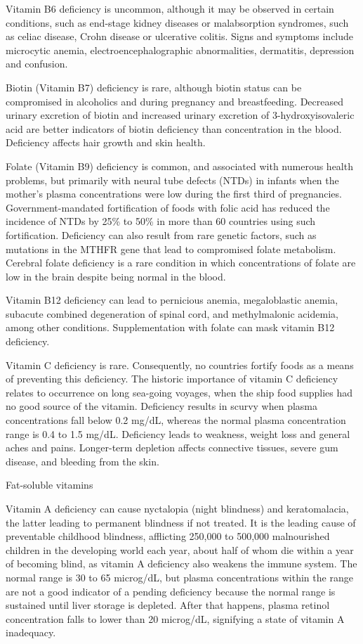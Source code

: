 \documentclass[
  openany]{book}
\begin{document}
Vitamin B6 deficiency is uncommon, although it may be observed in certain conditions, such as end-stage kidney diseases or malabsorption syndromes, such as celiac disease, Crohn disease or ulcerative colitis. Signs and symptoms include microcytic anemia, electroencephalographic abnormalities, dermatitis, depression and confusion.

Biotin (Vitamin B7) deficiency is rare, although biotin status can be compromised in alcoholics and during pregnancy and breastfeeding. Decreased urinary excretion of biotin and increased urinary excretion of 3-hydroxyisovaleric acid are better indicators of biotin deficiency than concentration in the blood. Deficiency affects hair growth and skin health.

Folate (Vitamin B9) deficiency is common, and associated with numerous health problems, but primarily with neural tube defects (NTDs) in infants when the mother's plasma concentrations were low during the first third of pregnancies. Government-mandated fortification of foods with folic acid has reduced the incidence of NTDs by 25\% to 50\% in more than 60 countries using such fortification. Deficiency can also result from rare genetic factors, such as mutations in the MTHFR gene that lead to compromised folate metabolism. Cerebral folate deficiency is a rare condition in which concentrations of folate are low in the brain despite being normal in the blood.

Vitamin B12 deficiency can lead to pernicious anemia, megaloblastic anemia, subacute combined degeneration of spinal cord, and methylmalonic acidemia, among other conditions. Supplementation with folate can mask vitamin B12 deficiency.

Vitamin C deficiency is rare. Consequently, no countries fortify foods as a means of preventing this deficiency. The historic importance of vitamin C deficiency relates to occurrence on long sea-going voyages, when the ship food supplies had no good source of the vitamin. Deficiency results in scurvy when plasma concentrations fall below 0.2 mg/dL, whereas the normal plasma concentration range is 0.4 to 1.5 mg/dL. Deficiency leads to weakness, weight loss and general aches and pains. Longer-term depletion affects connective tissues, severe gum disease, and bleeding from the skin.

Fat-soluble vitamins

Vitamin A deficiency can cause nyctalopia (night blindness) and keratomalacia, the latter leading to permanent blindness if not treated. It is the leading cause of preventable childhood blindness, afflicting 250,000 to 500,000 malnourished children in the developing world each year, about half of whom die within a year of becoming blind, as vitamin A deficiency also weakens the immune system. The normal range is 30 to 65 microg/dL, but plasma concentrations within the range are not a good indicator of a pending deficiency because the normal range is sustained until liver storage is depleted. After that happens, plasma retinol concentration falls to lower than 20 microg/dL, signifying a state of vitamin A inadequacy.
\end{document}
